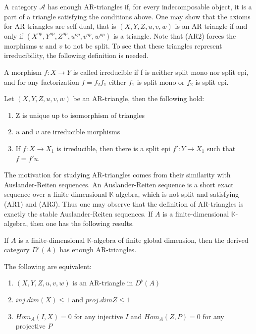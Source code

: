         A category $\mathcal{A}$ has enough AR-triangles if, for every indecomposable object, it is a part of a triangle satisfying the conditions above. One may show that the axioms for AR-triangles are self dual, that is $(X,Y,Z,u,v,w)$ is an AR-triangle if and only if $(X^{op},Y^{op},Z^{op},u^{op},v^{op},w^{op})$ is a triangle. Note that (AR2) forces the morphisms $u$ and $v$ to not be split. To see that these triangles represent irreducibility, the following definition is needed.

        \begin{definition}
            A morphism $f:X\rightarrow Y$ is called irreducible if f is neither split mono nor split epi, and for any factorization $f=f_2f_1$ either $f_1$ is split mono or $f_2$ is split epi.
        \end{definition}

        \begin{prop}
            Let $(X,Y,Z,u,v,w)$ be an AR-triangle, then the following hold:
            \begin{enumerate}
                \item Z is unique up to isomorphism of triangles
                \item $u$ and $v$ are irreducible morphisms
                \item If $f:X\rightarrow X_1$ is irreducible, then there is a split epi $f':Y\rightarrow X_1$ such that $f=f'u$.
            \end{enumerate}
        \end{prop}

        The motivation for studying AR-triangles comes from their similarity with Auslander-Reiten sequences. An Auslander-Reiten sequence is a short exact sequence over a finite-dimensional $\mathbb{K}$-algebra, which is not split and satisfying (AR1) and (AR3). Thus one may observe that the definition of AR-triangles is exactly the stable Auslander-Reiten sequences. If $A$ is a finite-dimensional $\mathbb{K}$-algebra, then one has the following results.

        \begin{theorem}
            If $A$ is a finite-dimensional $\mathbb{K}$-algebra of finite global dimension, then the derived category $D^{\flat}(A)$ has enough AR-triangles.
        \end{theorem}

        \begin{prop}
            The following are equivalent:
            \begin{enumerate}
                \item $(X,Y,Z,u,v,w)$ is an AR-triangle in $D^{\flat}(A)$
                \item $inj.dim(X)\leq 1$ and $proj.dim Z \leq 1$
                \item $Hom_A(I,X)=0$ for any injective $I$ and $Hom_A(Z,P)=0$ for any projective $P$
            \end{enumerate}
        \end{prop}
    
